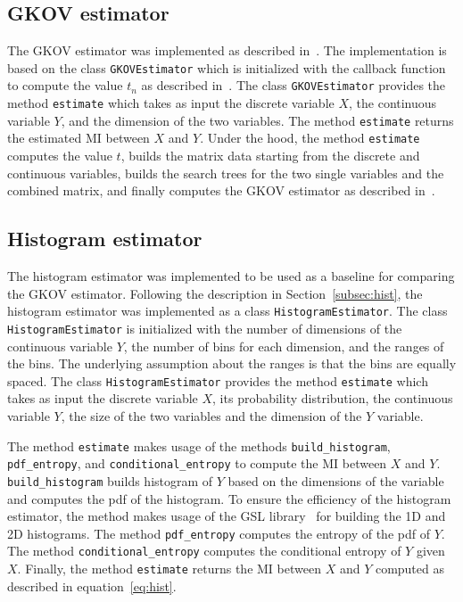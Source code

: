 \documentclass[12pt]{article}
\begin{document}
    \subsection{GKOV estimator}\label{subsec:gkov_impl}
    The GKOV estimator was implemented as described in~\cite{gkov}.
    The implementation is based on the class \texttt{GKOVEstimator} which is initialized with the callback function to compute the value $t_n$ as described in~\cite{roy_leakage_2022}.
    The class \texttt{GKOVEstimator} provides the method \texttt{estimate} which takes as input the discrete variable $X$, the continuous variable $Y$, and the dimension of the two variables.
    The method \texttt{estimate} returns the estimated MI between $X$ and $Y$.
    Under the hood, the method \texttt{estimate} computes the value $t$, builds the matrix data starting from the discrete and continuous variables, builds the search trees for the two single variables and the combined matrix, and finally computes the GKOV estimator as described in~\cite{roy_leakage_2022}.

    \subsection{Histogram estimator}\label{subsec:hist_impl}
    The histogram estimator was implemented to be used as a baseline for comparing the GKOV estimator.
    Following the description in Section~\ref{subsec:hist}, the histogram estimator was implemented as a class \texttt{HistogramEstimator}.
    The class \texttt{HistogramEstimator} is initialized with the number of dimensions of the continuous variable $Y$, the number of bins for each dimension, and the ranges of the bins.
    The underlying assumption about the ranges is that the bins are equally spaced.
    The class \texttt{HistogramEstimator} provides the method \texttt{estimate} which takes as input the discrete variable $X$, its probability distribution, the continuous variable $Y$, the size of the two variables and the dimension of the $Y$ variable.

    The method \texttt{estimate} makes usage of the methods \texttt{build\_histogram}, \texttt{pdf\_entropy}, and \texttt{conditional\_entropy} to compute the MI between $X$ and $Y$.
    \texttt{build\_histogram} builds histogram of $Y$ based on the dimensions of the variable and computes the pdf of the histogram.
    To ensure the efficiency of the histogram estimator, the method makes usage of the GSL library~\cite{gsl} for building the 1D and 2D histograms.
    The method \texttt{pdf\_entropy} computes the entropy of the pdf of $Y$.
    The method \texttt{conditional\_entropy} computes the conditional entropy of $Y$ given $X$.
    Finally, the method \texttt{estimate} returns the MI between $X$ and $Y$ computed as described in equation~\ref{eq:hist}.
\end{document}
